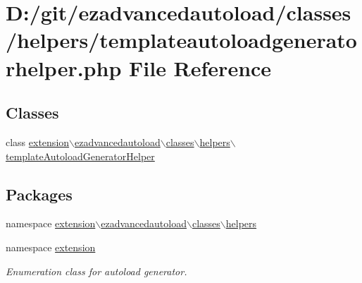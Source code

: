 \hypertarget{templateautoloadgeneratorhelper_8php}{\section{\-D\-:/git/ezadvancedautoload/classes/helpers/templateautoloadgeneratorhelper.php \-File \-Reference}
\label{templateautoloadgeneratorhelper_8php}
}
\subsection*{\-Classes}
\begin{DoxyCompactItemize}
\item 
class \hyperlink{classextension_1_1ezadvancedautoload_1_1classes_1_1helpers_1_1template_autoload_generator_helper}{extension$\backslash$ezadvancedautoload$\backslash$classes$\backslash$helpers$\backslash$template\-Autoload\-Generator\-Helper}
\end{DoxyCompactItemize}
\subsection*{\-Packages}
\begin{DoxyCompactItemize}
\item 
namespace \hyperlink{namespaceextension_1_1ezadvancedautoload_1_1classes_1_1helpers}{extension$\backslash$ezadvancedautoload$\backslash$classes$\backslash$helpers}
\item 
namespace \hyperlink{namespaceextension}{extension}
\begin{DoxyCompactList}\small\item\em \-Enumeration class for autoload generator. \end{DoxyCompactList}\end{DoxyCompactItemize}
